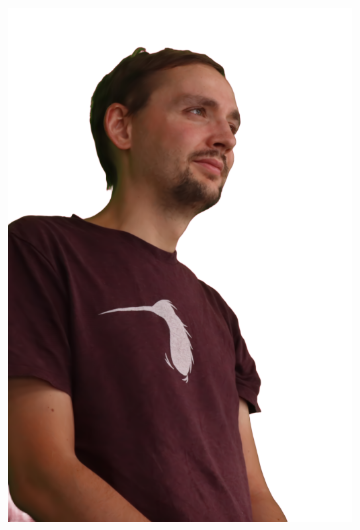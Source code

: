 \begin{figure}[!ht]
\begin{subfigure}{0.12\linewidth}
        \includegraphics[width=\textwidth]{Figures/results/initials/simon/21_render.png}
	\end{subfigure}
    \begin{subfigure}{0.12\linewidth}

\end{subfigure}
\end{figure}
